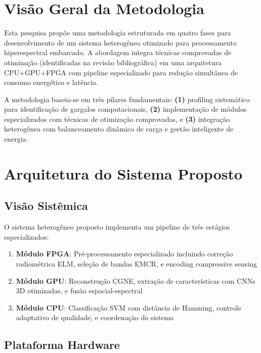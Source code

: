 
\section{Visão Geral da Metodologia}

Esta pesquisa propõe uma metodologia estruturada em quatro fases para desenvolvimento de um sistema heterogêneo otimizado para processamento hiperespectral embarcado. A abordagem integra técnicas comprovadas de otimização (identificadas na revisão bibliográfica) em uma arquitetura CPU+GPU+FPGA com pipeline especializado para redução simultânea de consumo energético e latência.

A metodologia baseia-se em três pilares fundamentais: \textbf{(1)} profiling sistemático para identificação de gargalos computacionais, \textbf{(2)} implementação de módulos especializados com técnicas de otimização comprovadas, e \textbf{(3)} integração heterogênea com balanceamento dinâmico de carga e gestão inteligente de energia.

\section{Arquitetura do Sistema Proposto}

\subsection{Visão Sistêmica}

O sistema heterogêneo proposto implementa um pipeline de três estágios especializados:

\begin{enumerate}
\item \textbf{Módulo FPGA}: Pré-processamento especializado incluindo correção radiométrica ELM, seleção de bandas EMCR, e encoding compressive sensing
\item \textbf{Módulo GPU}: Reconstrução CGNE, extração de características com CNNs 3D otimizadas, e fusão espacial-espectral
\item \textbf{Módulo CPU}: Classificação SVM com distância de Hamming, controle adaptativo de qualidade, e coordenação do sistema
\end{enumerate}

\subsection{Plataforma Hardware}

